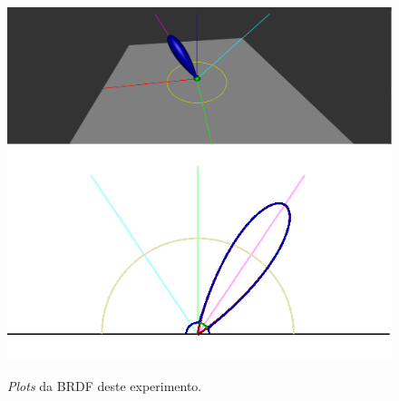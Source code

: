 \begin{figure}[H]
    \caption{\small{\textit{Plots} da BRDF deste experimento.}}\label{fig-blinn-phong-plots}
    \vspace{42px}
  \includegraphics[width=\linewidth]{./Imagens/brdfs/blinn-phong-3D-plot}
\endminipage\hfill
{}
  \includegraphics[width=\linewidth]{./Imagens/brdfs/blinn-phong-polar-plot-log.png}
\endminipage\hfill
\end{figure}

